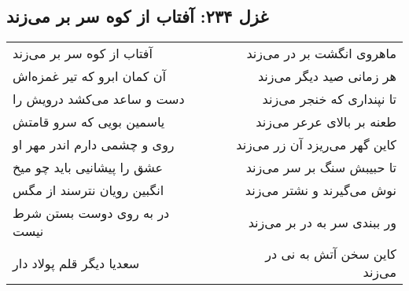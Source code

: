 \begin{center}
\section*{غزل ۲۳۴: آفتاب از کوه سر بر می‌زند}
\label{sec:234}
\begin{longtable}{l p{0.5cm} r}
آفتاب از کوه سر بر می‌زند
&&
ماهروی انگشت بر در می‌زند
\\
آن کمان ابرو که تیر غمزه‌اش
&&
هر زمانی صید دیگر می‌زند
\\
دست و ساعد می‌کشد درویش را
&&
تا نپنداری که خنجر می‌زند
\\
یاسمین بویی که سرو قامتش
&&
طعنه بر بالای عرعر می‌زند
\\
روی و چشمی دارم اندر مهر او
&&
کاین گهر می‌ریزد آن زر می‌زند
\\
عشق را پیشانیی باید چو میخ
&&
تا حبیبش سنگ بر سر می‌زند
\\
انگبین رویان نترسند از مگس
&&
نوش می‌گیرند و نشتر می‌زند
\\
در به روی دوست بستن شرط نیست
&&
ور ببندی سر به در بر می‌زند
\\
سعدیا دیگر قلم پولاد دار
&&
کاین سخن آتش به نی در می‌زند
\\
\end{longtable}
\end{center}
